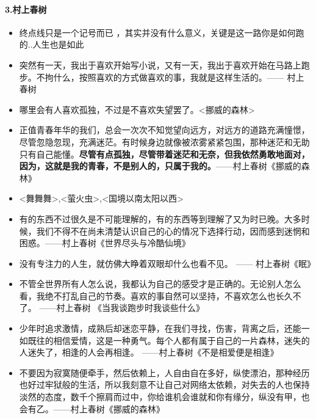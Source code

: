 \documentclass[UTF8,a4paper,8pt]{ctexbook}
\begin{document}
	\paragraph{3.村上春树}
		  \begin{itemize}
		  	\item 终点线只是一个记号而已 ，其实并没有什么意义，关键是这一路你是如何跑的..人生也是如此
		  	
		  	\item 突然有一天，我出于喜欢开始写小说，又有一天，我出于喜欢开始在马路上跑步。不拘什么，按照喜欢的方式做喜欢的事，我就是这样生活的。—— 村上春树
		  	
		  	\item 哪里会有人喜欢孤独，不过是不喜欢失望罢了。<挪威的森林>
		  	
		  	\item 正值青春年华的我们，总会一次次不知觉望向远方，对远方的道路充满憧憬，尽管忽隐忽现，充满迷茫。有时候身边就像被浓雾紧紧包围，那种迷茫和无助只有自己能懂。\textbf{尽管有点孤独，尽管带着迷茫和无奈，但我依然勇敢地面对，因为，这就是我的青春，不是别人的，只属于我的。}——村上春树《挪威的森林》
		  	
		  	\item <舞舞舞>,<萤火虫>,<国境以南太阳以西>
		  	
		  	\item 有的东西不过很久是不可能理解的，有的东西等到理解了又为时已晚。大多时候，我们不得不在尚未清楚认识自己的心的情况下选择行动，因而感到迷惘和困惑。——村上春树《世界尽头与冷酷仙境》
		  	
		  	\item 没有专注力的人生，就仿佛大睁着双眼却什么也看不见。 —— 村上春树《眠》
		  	
		  	\item 不管全世界所有人怎么说，我都认为自己的感受才是正确的。无论别人怎么看，我绝不打乱自己的节奏。喜欢的事自然可以坚持，不喜欢怎么也长久不了。	——村上春树 《当我谈跑步时我谈些什么》
		  	
		  	\item 少年时追求激情，成熟后却迷恋平静，在我们寻找，伤害，背离之后，还能一如既往的相信爱情，这是一种勇气。每个人都有属于自己的一片森林，迷失的人迷失了，相逢的人会再相逢。 ——村上春树《不是相爱便是相逢》
		  	
		  	\item 不要因为寂寞随便牵手，然后依赖上，人自由自在多好，纵使漂泊，那种经历也好过牢狱般的生活，所以我刻意不让自己对网络太依赖，对失去的人也保持淡然的态度，数千个擦肩而过中，你给谁机会谁就和你有缘分，纵没有甲，也会有乙。——村上春树《挪威的森林》
		  \end{itemize}   
	
\end{document}
